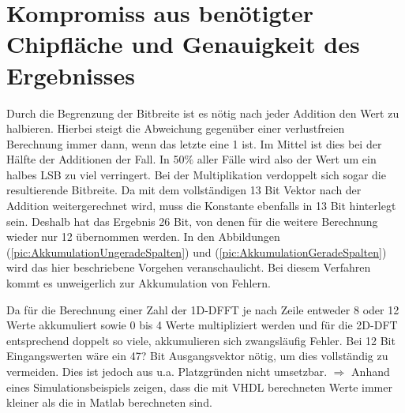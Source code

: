 \section{Kompromiss aus benötigter Chipfläche und Genauigkeit des Ergebnisses}
Durch die Begrenzung der Bitbreite ist es nötig nach jeder Addition den Wert zu halbieren. Hierbei steigt die Abweichung gegenüber einer verlustfreien Berechnung immer dann, 
wenn das letzte eine 1 ist. Im Mittel ist dies bei der Hälfte der Additionen der Fall. In 50$\%$ aller Fälle wird also der Wert um ein halbes LSB zu viel verringert.
Bei der Multiplikation verdoppelt sich sogar die resultierende Bitbreite. Da mit dem vollständigen 13 Bit Vektor nach der Addition weitergerechnet wird, muss die Konstante
ebenfalls in 13 Bit hinterlegt sein. Deshalb hat das Ergebnis 26 Bit, von denen für die weitere Berechnung wieder nur 12 übernommen werden. In den Abbildungen 
(\ref{pic:AkkumulationUngeradeSpalten}) und (\ref{pic:AkkumulationGeradeSpalten}) wird das hier beschriebene Vorgehen veranschaulicht. Bei diesem Verfahren
kommt es unweigerlich zur Akkumulation von Fehlern.
 
Da für die Berechnung einer Zahl der 1D-DFFT je nach Zeile entweder 8 oder 12 Werte akkumuliert sowie 0 bis 4 Werte multipliziert werden und für die 2D-DFT entsprechend doppelt 
so viele, akkumulieren sich zwangsläufig Fehler. Bei 12 Bit Eingangswerten wäre ein 47? Bit Ausgangsvektor nötig, um dies vollständig zu vermeiden. Dies ist jedoch aus u.a.
Platzgründen nicht umsetzbar.
$\Rightarrow$ Anhand eines Simulationsbeispiels zeigen, dass die mit VHDL berechneten Werte immer kleiner als die in Matlab berechneten sind.
